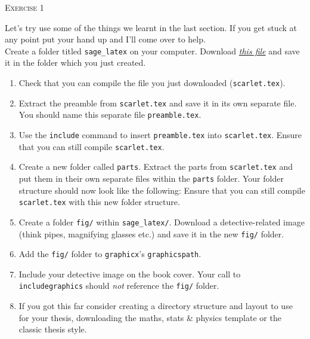 \documentclass{article}
\begin{document}
\begin{center}
  \Large\color{black!80}\textsc{Exercise 1}
\end{center}

Let's try use some of the things we learnt in the last section. If you
get stuck at any point put your hand up and I'll come over to help.\\

Create a folder titled \texttt{sage\_latex} on your computer. Download
\href{https://jwalton.info/assets/teaching/latex/scarlet.tex}{\emph{this file}} 
and save it in the folder which you just created.

\begin{enumerate}[label=\color{purple}\theenumi.]

  \item Check that you can compile the file you just downloaded
    (\texttt{scarlet.tex}).

  \item Extract the preamble from \texttt{scarlet.tex} and save it in its own
    separate file. You should name this separate file
    \texttt{preamble.tex}.

  \item Use the \texttt{\tb include} command to insert
    \texttt{preamble.tex} into \texttt{scarlet.tex}. Ensure that you can
    still compile \texttt{scarlet.tex}.

  \item{Create a new folder called \texttt{parts}. Extract the parts from 
    \texttt{scarlet.tex} and put them in their own separate files within
    the \texttt{parts} folder. Your folder structure should now look
    like the following:
    \vspace{0.25cm}
    Ensure that you can still compile \texttt{scarlet.tex} with this new 
    folder structure.}

  \item Create a folder \texttt{fig/} within \texttt{sage\_latex/}. Download a
    detective-related image (think pipes, magnifying glasses etc.) and
    save it in the new \texttt{fig/} folder.

  \item Add the \texttt{fig/} folder to \texttt{graphicx}'s
    \texttt{graphicspath}.

  \item Include your detective image on the book cover. Your call to
    \texttt{\tb includegraphics} should \emph{not} reference the
    \texttt{fig/} folder.
    
  \item If you got this far consider creating a directory structure and layout
    to use for your thesis, downloading the maths, stats \& physics template or
    the classic thesis style.

\end{enumerate}
\end{document}
